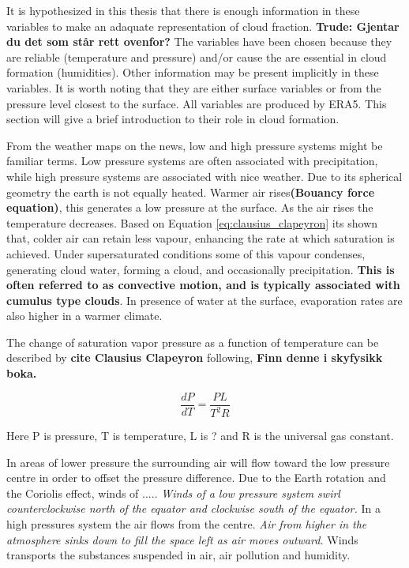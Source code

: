 It is hypothesized in this thesis that there is enough information in these variables to make an adaquate representation of cloud fraction. \textbf{Trude: Gjentar du det som står rett ovenfor?} The variables have been chosen because they are reliable (temperature and pressure) and/or cause the are essential in cloud formation (humidities). Other information may be present implicitly in these variables. It is worth noting that they are either surface variables or from the pressure level closest to the surface. All variables are produced by ERA5. This section will give a brief introduction to their role in cloud formation. 

From the weather maps on the news, low and high pressure systems might be familiar terms. Low pressure systems are often associated with precipitation, while high pressure systems are associated with nice weather. Due to its spherical geometry the earth is not equally heated. Warmer air rises\textbf{(Bouancy force equation)}, this generates a low pressure at the surface. As the air rises the temperature decreases. Based on Equation \eqref{eq:clausius_clapeyron} its shown that, colder air can retain less vapour, enhancing the rate at which saturation is achieved. Under supersaturated conditions some of this vapour condenses, generating cloud water, forming a cloud, and occasionally precipitation. \textbf{This is often referred to as convective motion, and is typically associated with cumulus type clouds}. In presence of water at the surface, evaporation rates are also higher in a warmer climate. 

The change of saturation vapor pressure as a function of temperature can be described by  \textbf{cite Clausius Clapeyron} following, \textbf {Finn denne i skyfysikk boka.}

\begin{equation} \label{eq:clausius-claperon}
    \frac{dP}{dT} = \frac{PL}{T^2R}
\end{equation}

Here P is pressure, T is temperature, L is ? and R is the universal gas constant.

In areas of lower pressure the surrounding air will flow toward the low pressure centre in order to offset the pressure difference. Due to the Earth rotation and the Coriolis effect, winds of ..... \textit{Winds of a low pressure system swirl counterclockwise north of the equator and clockwise south of the equator.} In a high pressures system the air flows from the centre. \textit{Air from higher in the atmosphere sinks down to fill the space left as air moves outward.} Winds transports the substances suspended in air, air pollution and humidity.

